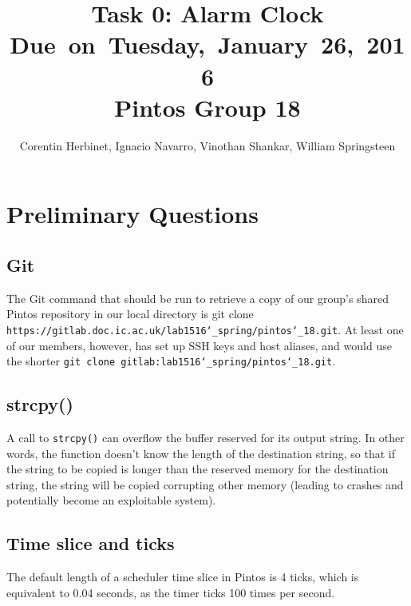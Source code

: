 \documentclass{article}
\title{
\vspace{2in}
\textmd{\textbf{Task 0: Alarm Clock}}\\
\normalsize\vspace{0.1in}\small{Due\ on\ Tuesday,\ January\ 26,\ 2016}\\
\vspace{0.1in}\large{\textbf{Pintos Group 18}}
\vspace{3in}
}
\author{Corentin Herbinet, Ignacio Navarro, Vinothan Shankar, William Springsteen}
\date{}
\renewcommand{\_}{\char`_}
\begin{document}
\maketitle

\newpage


\section{Preliminary Questions}
\subsection{Git}
The Git command that should be run to retrieve a copy of our group's shared 
Pintos repository in our local directory is git clone \texttt{https://gitlab.doc.ic.ac.uk/lab1516\char`_spring/pintos\char`_18.git}.
At least one of our members, however, has set up SSH keys and host aliases,
and would use the shorter \texttt{git clone gitlab:lab1516\char`_spring/pintos\char`_18.git}.

\subsection{strcpy()}
A call to \texttt{strcpy()} can overflow the buffer reserved for its output string. 
In other words, the function doesn't know the length of the destination string,
so that if the string to be copied is longer than the reserved memory for 
the destination string, the string will be copied corrupting other memory 
(leading to crashes and potentially become an exploitable system).


\subsection{Time slice and ticks}
The default length of a scheduler time slice in Pintos is 4 ticks, 
which is equivalent to 0.04 seconds, as the timer ticks 100 times per second.
\end{document}

